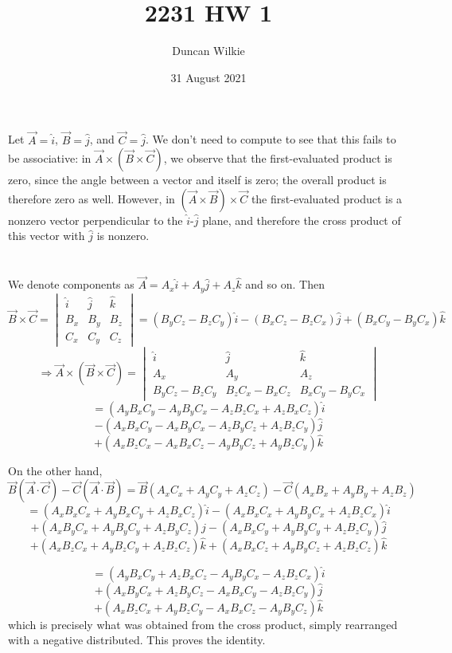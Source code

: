 \documentclass[letterpaper, 11pt]{article}
\title{2231 HW 1}
\author{Duncan Wilkie}
\date{31 August 2021}
\begin{document}
\maketitle

\section{}
Let $\vec{A}=\hat{i}$, $\vec{B}=\hat{j}$, and $\vec{C}=\hat{j}$. We don't need to compute to see that this fails to be associative: in $\vec{A}\times(\vec{B}\times\vec{C})$, we observe that the first-evaluated product is zero, since the angle between a vector and itself is zero; the overall product is therefore zero as well. However, in $(\vec{A}\times\vec{B})\times\vec{C}$ the first-evaluated product is a nonzero vector perpendicular to the $\hat{i}$-$\hat{j}$ plane, and therefore the cross product of this vector with $\hat{j}$ is nonzero.
\section{}
We denote components as $\vec{A}=A_x\hat{i}+A_y\hat{j}+A_z\hat{k}$ and so on. Then
\[\vec{B}\times\vec{C}=\begin{vmatrix} \hat{i} & \hat{j} & \hat{k}\\ B_x & B_y & B_z \\ C_x & C_y & C_z \end{vmatrix}=(B_yC_z-B_zC_y)\hat{i}-(B_xC_z-B_zC_x)\hat{j}+(B_xC_y-B_yC_x)\hat{k}\]
\[\Rightarrow \vec{A}\times(\vec{B}\times\vec{C})=\begin{vmatrix} \hat{i} & \hat{j} & \hat{k}\\ A_x & A_y & A_z\\ B_yC_z-B_zC_y & B_zC_x-B_xC_z & B_xC_y-B_yC_x\end{vmatrix}\]
\[=(A_yB_xC_y-A_yB_yC_x-A_zB_zC_x+A_zB_xC_z)\hat{i}\]\[-(A_xB_xC_y-A_xB_yC_x-A_zB_yC_z+A_zB_zC_y)\hat{j}\]\[+(A_xB_zC_x-A_xB_xC_z-A_yB_yC_z+A_yB_zC_y)\hat{k}\]

On the other hand, \[\vec{B}(\vec{A}\cdot\vec{C})-\vec{C}(\vec{A}\cdot\vec{B}) =\vec{B}(A_xC_x+A_yC_y+A_zC_z)-\vec{C}(A_xB_x+A_yB_y+ A_zB_z)\]
\[=(A_xB_xC_x+A_yB_xC_y+A_zB_xC_z)\hat{i}-(A_xB_xC_x+A_yB_yC_x + A_zB_zC_x)\hat{i}\]
\[+(A_xB_yC_x+A_yB_yC_y+A_zB_yC_z)\hat{j}-(A_xB_xC_y+A_yB_yC_y+A_zB_zC_y)\hat{j}\]
\[+(A_xB_zC_x+A_yB_zC_y+A_zB_zC_z)\hat{k}+(A_xB_xC_z+A_yB_yC_z+A_zB_zC_z)\hat{k}\]

\[=(A_yB_xC_y + A_zB_xC_z-A_yB_yC_x-A_zB_zC_x)\hat{i}\]
\[+(A_xB_yC_x+A_zB_yC_z-A_xB_xC_y-A_zB_zC_y)\hat{j}\]
\[+(A_xB_zC_x+A_yB_zC_y-A_xB_xC_z-A_yB_yC_z)\hat{k}\]
which is precisely what was obtained from the cross product, simply rearranged with a negative distributed. This proves the identity.
\end{document}
